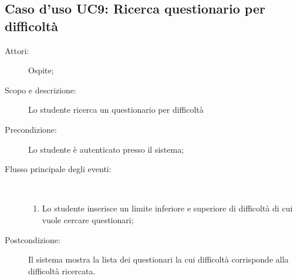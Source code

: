 \subsection{Caso d'uso UC9: Ricerca questionario per difficoltà}\begin{description}
	\item[Attori:] Ospite;
	\item[Scopo e descrizione:] Lo studente ricerca un questionario per difficoltà
	\item[Precondizione:] Lo studente è autenticato presso il sistema;
	
	\item[Flusso principale degli eventi:] \ 
	\begin{enumerate}
		\item Lo studente inserisce un limite inferiore e superiore di difficoltà di cui vuole cercare questionari;
		
	\end{enumerate}
	\item[Postcondizione:] Il sistema mostra la lista dei questionari la cui difficoltà corrisponde alla difficoltà ricercata.
\end{description}
\hypertarget{UC10}{}

